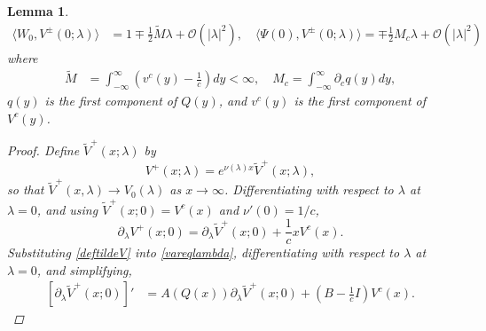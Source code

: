 \documentclass[10pt,reqno]{amsart}
\theoremstyle{plain}
\newtheorem{lemma}[theorem]{Lemma}
\theoremstyle{definition}
\theoremstyle{remark}
\numberwithin{theorem}{section}
\numberwithin{equation}{section}
\begin{document}
\begin{lemma}\label{lemma:VpmPsiIP}
\begin{equation}\label{VpmIPs}
\begin{aligned}
\langle W_0, V^\pm(0; \lambda) \rangle &= 1 \mp \frac{1}{2} \tilde{M}\lambda + \mathcal{O}(|\lambda|^2), \quad
\langle \Psi(0), V^\pm(0; \lambda) \rangle = \mp \frac{1}{2} M_c \lambda + \mathcal{O}(|\lambda|^2)
\end{aligned}
\end{equation}
where
\begin{align*}
\tilde{M} &= \int_{-\infty}^{\infty} \left(v^c(y) - \frac{1}{c}\right) dy < \infty, \quad
M_c = \int_{-\infty}^\infty \partial_c q(y) dy,
\end{align*}
$q(y)$ is the first component of $Q(y)$, and $v^c(y)$ is the first component of $V^c(y)$.
\begin{proof}
Define $\tilde{V}^+(x; \lambda)$ by
\begin{equation}\label{deftildeV}
V^+(x; \lambda) = e^{\nu(\lambda)x}\tilde{V}^+(x; \lambda),
\end{equation}
so that $\tilde{V}^+(x, \lambda) \rightarrow V_0(\lambda)$ as $x \rightarrow \infty$. Differentiating with respect to $\lambda$ at $\lambda = 0$, and using $\tilde{V}^+(x; 0) = V^c(x)$ and $\nu'(0) = 1/c$,
\begin{equation}\label{VtildeVderiv}
\partial_\lambda V^+(x; 0)
= \partial_\lambda \tilde{V}^+(x; 0) + \frac{1}{c} x V^c(x).
\end{equation}
Substituting \cref{deftildeV} into \cref{vareqlambda}, differentiating with respect to $\lambda$ at $\lambda = 0$, and simplifying, 
\begin{align}\label{tildeVsolves}
[\partial_\lambda \tilde{V}^+(x; 0)]' &= A(Q(x))\partial_\lambda \tilde{V}^+(x; 0) + \left( B - \frac{1}{c}I\right) V^c(x).
\end{align}


\end{proof}
\end{lemma}
\end{document}
